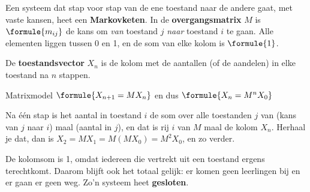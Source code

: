 \begin{theorie}
Een systeem dat stap voor stap van de ene toestand naar de andere gaat, met vaste kansen, heet een \textbf{\textcolor{accent}{Markovketen}}. In de \textbf{\textcolor{accent}{overgangsmatrix}} $M$ is $\formule{m_{ij}}$ de kans om \emph{van} toestand $j$ \emph{naar} toestand $i$ te gaan. Alle elementen liggen tussen 0 en 1, en de som van elke kolom is $\formule{1}$.

\vspace{1mm}
De \textbf{\textcolor{accent}{toestandsvector}} $X_n$ is de kolom met de aantallen (of de aandelen) in elke toestand na $n$ stappen.

\begin{stelling}{Matrixmodel}
\qquad $\formule{X_{n+1} = M X_n}$ \qquad en dus \qquad $\formule{X_n = M^n X_0}$
\end{stelling}

\begin{bewijs}
Na één stap is het aantal in toestand $i$ de som over alle toestanden $j$ van (kans van $j$ naar $i$) maal (aantal in $j$), en dat is rij $i$ van $M$ maal de kolom $X_n$. Herhaal je dat, dan is $X_2 = M X_1 = M (M X_0) = M^2 X_0$, en zo verder.
\end{bewijs}
\end{theorie}

De kolomsom is 1, omdat iedereen die vertrekt uit een toestand ergens terechtkomt. Daarom blijft ook het totaal gelijk: er komen geen leerlingen bij en er gaan er geen weg. Zo'n systeem heet \textbf{gesloten}.


